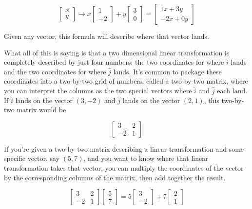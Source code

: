 \begin{equation*}
  \begin{bmatrix}
    x \\
    y
  \end{bmatrix} \rightarrow x\begin{bmatrix}
    1 \\
    -2
  \end{bmatrix} + y\begin{bmatrix}
    3 \\
    0
  \end{bmatrix} = \begin{bmatrix}
    1x + 3y \\
    -2x + 0y
  \end{bmatrix}
\end{equation*}

Given any vector, this formula will describe where that vector lands.

What all of this is saying is that a two dimensional linear transformation is
completely described by just four numbers: the two coordinates for where
$\hat{i}$ lands and the two coordinates for where $\hat{j}$ lands. It's common
to package these coordinates into a two-by-two grid of numbers, called a
two-by-two matrix, where you can interpret the columns as the two special
vectors where $\hat{i}$ and $\hat{j}$ each land. If $\hat{i}$ lands on the
vector $(3, -2)$ and $\hat{j}$ lands on the vector $(2, 1)$, this two-by-two
matrix would be

\begin{equation*}
  \begin{bmatrix}
    3 & 2 \\
    -2 & 1
  \end{bmatrix}
\end{equation*}

If you're given a two-by-two matrix describing a linear transformation and some
specific vector, say $(5, 7)$, and you want to know where that linear
transformation takes that vector, you can multiply the coordinates of the vector
by the corresponding columns of the matrix, then add together the result.

\begin{equation*}
  \begin{bmatrix}
    3 & 2 \\
    -2 & 1
  \end{bmatrix}
  \begin{bmatrix}
    5 \\
    7
  \end{bmatrix} = 5\begin{bmatrix}
    3 \\
    -2
  \end{bmatrix} + 7\begin{bmatrix}
    2 \\
    1
  \end{bmatrix}
\end{equation*}

